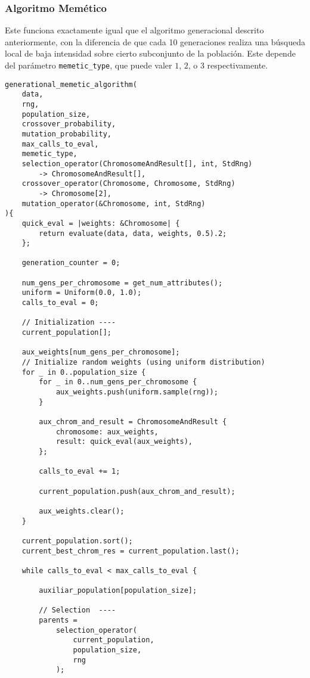 \documentclass[size=a4, parskip=half, titlepage=false, toc=flat, toc=bib, 12pt]{scrartcl}
\begin{document}
\subsubsection{Algoritmo Memético}
Este funciona exactamente igual que el algoritmo generacional descrito anteriormente, con la diferencia de que cada 10 generaciones realiza una búsqueda local de baja intensidad sobre cierto subconjunto de la población. Este depende del parámetro \texttt{memetic\_type}, que puede valer $1$, $2$, o $3$ respectivamente.
\begin{verbatim}
generational_memetic_algorithm(
    data,
    rng,
    population_size,
    crossover_probability,
    mutation_probability,
    max_calls_to_eval,
    memetic_type,
    selection_operator(ChromosomeAndResult[], int, StdRng)
        -> ChromosomeAndResult[],
    crossover_operator(Chromosome, Chromosome, StdRng)
        -> Chromosome[2],
    mutation_operator(&Chromosome, int, StdRng)
){
    quick_eval = |weights: &Chromosome| {
        return evaluate(data, data, weights, 0.5).2;
    };

    generation_counter = 0;

    num_gens_per_chromosome = get_num_attributes();
    uniform = Uniform(0.0, 1.0);
    calls_to_eval = 0;

    // Initialization ----
    current_population[];

    aux_weights[num_gens_per_chromosome];
    // Initialize random weights (using uniform distribution)
    for _ in 0..population_size {
        for _ in 0..num_gens_per_chromosome {
            aux_weights.push(uniform.sample(rng));
        }

        aux_chrom_and_result = ChromosomeAndResult {
            chromosome: aux_weights,
            result: quick_eval(aux_weights),
        };

        calls_to_eval += 1;

        current_population.push(aux_chrom_and_result);

        aux_weights.clear();
    }

    current_population.sort();
    current_best_chrom_res = current_population.last();

    while calls_to_eval < max_calls_to_eval {

        auxiliar_population[population_size];

        // Selection  ----
        parents =
            selection_operator(
                current_population,
                population_size,
                rng
            );


\end{verbatim}
\end{document}

